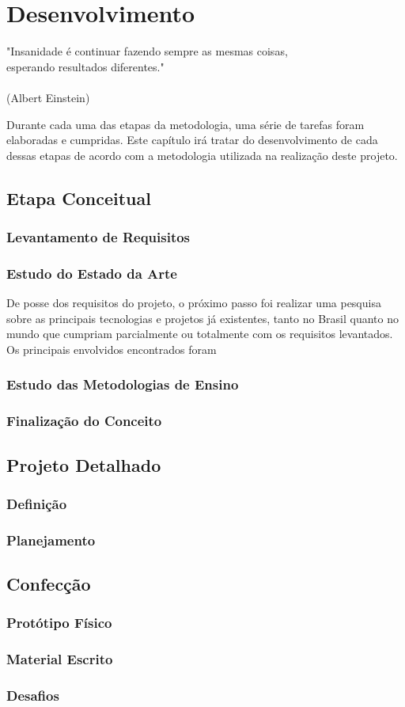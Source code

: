 \chapter{Desenvolvimento}
\label{chap:desen_test}
\begin{flushright}
	"Insanidade é continuar fazendo sempre as mesmas coisas, \\ 
	esperando resultados diferentes." \\
	\ \\
	(Albert Einstein)
\end{flushright}

Durante cada uma das etapas da metodologia, uma série de tarefas foram elaboradas e cumpridas. Este capítulo irá tratar do desenvolvimento de cada dessas etapas de acordo com a metodologia utilizada na realização deste projeto.

\section{Etapa Conceitual}
\subsection{Levantamento de Requisitos}
\subsection{Estudo do Estado da Arte}
De posse dos requisitos do projeto, o próximo passo foi realizar uma pesquisa sobre as principais tecnologias e projetos já existentes, tanto no Brasil quanto no mundo que cumpriam parcialmente ou totalmente com os requisitos levantados. Os principais envolvidos encontrados foram 
\subsection{Estudo das Metodologias de Ensino}
\subsection{Finalização do Conceito}

\section{Projeto Detalhado}
\subsection{Definição}
\subsection{Planejamento}

\section{Confecção}
\subsection{Protótipo Físico}
\subsection{Material Escrito}
\subsection{Desafios}

